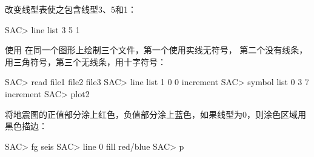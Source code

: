 改变线型表使之包含线型3、5和1：
\begin{SACCode}
SAC> line list 3 5 1
\end{SACCode}

使用  在同一个图形上绘制三个文件，第一个使用实线无符号，
第二个没有线条，用三角符号，第三个无线条，用十字符号：
\begin{SACCode}
SAC> read file1 file2 file3
SAC> line list 1 0 0 increment
SAC> symbol list 0 3 7 increment
SAC> plot2
\end{SACCode}

将地震图的正值部分涂上红色，负值部分涂上蓝色，如果线型为0，则涂色区域用黑色描边：
\begin{SACCode}
SAC> fg seis
SAC> line 0 fill red/blue
SAC> p
\end{SACCode}
